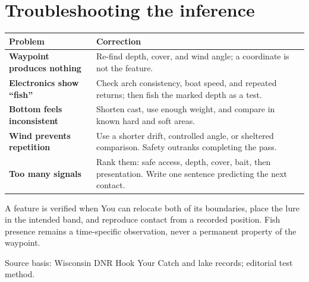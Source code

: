 \section{Troubleshooting the inference}
\begin{tabularx}{\linewidth}{@{}>{\bfseries}p{.25\linewidth}X@{}}
\toprule Problem&Correction\\\midrule
Waypoint produces nothing&Re-find depth, cover, and wind angle; a coordinate is
not the feature.\\
Electronics show “fish”&Check arch consistency, boat speed, and repeated
returns; then fish the marked depth as a test.\\
Bottom feels inconsistent&Shorten cast, use enough weight, and compare in known
hard and soft areas.\\
Wind prevents repetition&Use a shorter drift, controlled angle, or sheltered
comparison. Safety outranks completing the pass.\\
Too many signals&Rank them: safe access, depth, cover, bait, then presentation.
Write one sentence predicting the next contact.\\
\bottomrule
\end{tabularx}
\begin{telospanel}{A feature is verified when}
You can relocate both of its boundaries, place the lure in the intended band,
and reproduce contact from a recorded position. Fish presence remains a
time-specific observation, never a permanent property of the waypoint.
\end{telospanel}

\small Source basis: Wisconsin DNR Hook Your Catch and lake records; editorial
test method.

